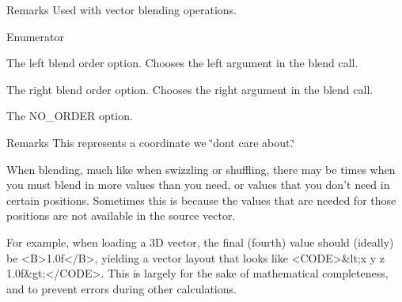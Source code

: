 \begin{DoxyRemark}{Remarks}
Used with vector blending operations. 
\end{DoxyRemark}
\begin{Desc}
\item[Enumerator]\par
\begin{description}
\item[{\em 
\hypertarget{namespacegfxmath_ac03f836d004dbed0f2219c54b8e63e3da48d2a91c97bb0e96285fd218fbd098f5}{}L\+E\+F\+T\label{namespacegfxmath_ac03f836d004dbed0f2219c54b8e63e3da48d2a91c97bb0e96285fd218fbd098f5}
}]The left blend order option. Chooses the left argument in the blend call. \item[{\em 
\hypertarget{namespacegfxmath_ac03f836d004dbed0f2219c54b8e63e3da28dcb685e33dd6cc73f168dbf003894e}{}R\+I\+G\+H\+T\label{namespacegfxmath_ac03f836d004dbed0f2219c54b8e63e3da28dcb685e33dd6cc73f168dbf003894e}
}]The right blend order option. Chooses the right argument in the blend call. \item[{\em 
\hypertarget{namespacegfxmath_ac03f836d004dbed0f2219c54b8e63e3da631e9eab7013501bd492e4730e793d27}{}N\+O\+\_\+\+O\+R\+D\+E\+R\label{namespacegfxmath_ac03f836d004dbed0f2219c54b8e63e3da631e9eab7013501bd492e4730e793d27}
}]The N\+O\+\_\+\+O\+R\+D\+E\+R option. \begin{DoxyRemark}{Remarks}
This represents a coordinate we \char`\"{}don\textquotesingle{}t care about.\char`\"{} \begin{DoxyVerb}           When blending, much like when swizzling or shuffling, there may be times when you must blend in
           more values than you need, or values that you don't need in certain positions.  Sometimes this is
           because the values that are needed for those positions are not available in the source vector.

           For example, when loading a 3D vector, the final (fourth) value should (ideally) be <B>1.0f</B>,
           yielding a vector layout that looks like <CODE>&lt;x y z 1.0f&gt;</CODE>.
           This is largely for the sake of mathematical completeness, and to prevent errors during other calculations.


\end{DoxyVerb}
\end{DoxyRemark}
\end{description}
\end{Desc}

